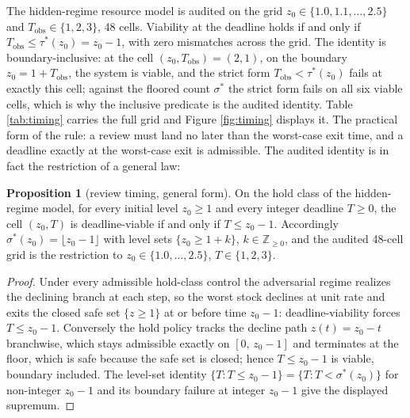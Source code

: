\documentclass[10pt,twocolumn]{article}
\theoremstyle{definition}
\newtheorem{proposition}{Proposition}
\begin{document}
The hidden-regime resource model is audited on the grid
\(z_0 \in \{1.0, 1.1, \dots, 2.5\}\) and
\(T_{\mathrm{obs}} \in \{1, 2, 3\}\), 48 cells. Viability at the
deadline holds if and only if
\(T_{\mathrm{obs}} \le \tau^{*}(z_0) = z_0 - 1\), with zero
mismatches across the grid. The identity is boundary-inclusive: at the
cell \((z_0, T_{\mathrm{obs}}) = (2, 1)\), on the boundary
\(z_0 = 1 + T_{\mathrm{obs}}\), the system is viable, and the strict form \(T_{\mathrm{obs}} <
\tau^{*}(z_0)\) fails at exactly this cell; against the floored count
\(\sigma^{*}\) the strict form fails on all six viable cells, which is
why the inclusive predicate is the audited identity.
Table \ref{tab:timing} carries the full grid and Figure
\ref{fig:timing} displays it. The practical form of the rule: a review
must land no later than the worst-case exit time, and a deadline exactly
at the worst-case exit is admissible. The audited identity is in fact the
restriction of a general law:

\begin{proposition}[review timing, general form]\label{prop:timing}
On the hold class of the hidden-regime model, for every initial level
\(z_0 \ge 1\) and every integer deadline \(T \ge 0\), the cell
\((z_0, T)\) is deadline-viable if and only if \(T \le z_0 - 1\).
Accordingly \(\sigma^{*}(z_0) = \lfloor z_0 - 1 \rfloor\) with level
sets \(\{z_0 \ge 1 + k\}\), \(k \in \mathbb{Z}_{\ge 0}\), and the
audited 48-cell grid is the restriction to \(z_0 \in \{1.0, \dots,
2.5\}\), \(T \in \{1, 2, 3\}\).
\end{proposition}

\begin{proof}
Under every admissible hold-class control the adversarial regime realizes
the declining branch at each step, so the worst stock declines at unit
rate and exits the closed safe set \(\{z \ge 1\}\) at or before time
\(z_0 - 1\): deadline-viability forces \(T \le z_0 - 1\). Conversely
the hold policy tracks the decline path \(z(t) = z_0 - t\) branchwise,
which stays admissible exactly on \([0,\, z_0 - 1]\) and terminates at
the floor, which is safe because the safe set is closed; hence
\(T \le z_0 - 1\) is viable, boundary included. The level-set identity
\(\{T : T \le z_0 - 1\} = \{T : T < \sigma^{*}(z_0)\}\) for
non-integer \(z_0 - 1\) and its boundary failure at integer
\(z_0 - 1\) give the displayed supremum.
\end{proof}
\end{document}
